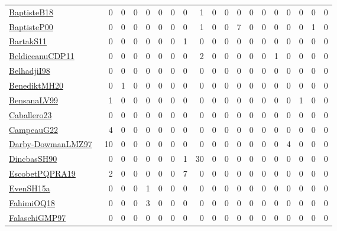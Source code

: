 {\begin{longtable}{l*{18}{r}}
\href{articles/BaptisteB18.pdf}{BaptisteB18}~\cite{BaptisteB18} & 0 & 0 & 0 & 0 & 0 & 0 & 0 & 1 & 0 & 0 & 0 & 0 & 0 & 0 & 0 & 0 & 0 & 0\\
\href{articles/BaptisteP00.pdf}{BaptisteP00}~\cite{BaptisteP00} & 0 & 0 & 0 & 0 & 0 & 0 & 0 & 1 & 0 & 0 & 7 & 0 & 0 & 0 & 0 & 0 & 1 & 0\\
\href{articles/BartakS11.pdf}{BartakS11}~\cite{BartakS11} & 0 & 0 & 0 & 0 & 0 & 0 & 1 & 0 & 0 & 0 & 0 & 0 & 0 & 0 & 0 & 0 & 0 & 0\\
\href{articles/BeldiceanuCDP11.pdf}{BeldiceanuCDP11}~\cite{BeldiceanuCDP11} & 0 & 0 & 0 & 0 & 0 & 0 & 0 & 2 & 0 & 0 & 0 & 0 & 0 & 1 & 0 & 0 & 0 & 0\\
\href{articles/BelhadjiI98.pdf}{BelhadjiI98}~\cite{BelhadjiI98} & 0 & 0 & 0 & 0 & 0 & 0 & 0 & 0 & 0 & 0 & 0 & 0 & 0 & 0 & 0 & 0 & 0 & 0\\
\href{articles/BenediktMH20.pdf}{BenediktMH20}~\cite{BenediktMH20} & 0 & 1 & 0 & 0 & 0 & 0 & 0 & 0 & 0 & 0 & 0 & 0 & 0 & 0 & 0 & 0 & 0 & 0\\
\href{articles/BensanaLV99.pdf}{BensanaLV99}~\cite{BensanaLV99} & 1 & 0 & 0 & 0 & 0 & 0 & 0 & 0 & 0 & 0 & 0 & 0 & 0 & 0 & 0 & 1 & 0 & 0\\
\href{articles/Caballero23.pdf}{Caballero23}~\cite{Caballero23} & 0 & 0 & 0 & 0 & 0 & 0 & 0 & 0 & 0 & 0 & 0 & 0 & 0 & 0 & 0 & 0 & 0 & 0\\
\href{articles/CampeauG22.pdf}{CampeauG22}~\cite{CampeauG22} & 4 & 0 & 0 & 0 & 0 & 0 & 0 & 0 & 0 & 0 & 0 & 0 & 0 & 0 & 0 & 0 & 0 & 0\\
\href{articles/Darby-DowmanLMZ97.pdf}{Darby-DowmanLMZ97}~\cite{Darby-DowmanLMZ97} & 10 & 0 & 0 & 0 & 0 & 0 & 0 & 0 & 0 & 0 & 0 & 0 & 0 & 0 & 4 & 0 & 0 & 0\\
\href{articles/DincbasSH90.pdf}{DincbasSH90}~\cite{DincbasSH90} & 0 & 0 & 0 & 0 & 0 & 0 & 1 & 30 & 0 & 0 & 0 & 0 & 0 & 0 & 0 & 0 & 0 & 0\\
\href{articles/EscobetPQPRA19.pdf}{EscobetPQPRA19}~\cite{EscobetPQPRA19} & 2 & 0 & 0 & 0 & 0 & 0 & 7 & 0 & 0 & 0 & 0 & 0 & 0 & 0 & 0 & 0 & 0 & 0\\
\href{articles/EvenSH15a.pdf}{EvenSH15a}~\cite{EvenSH15a} & 0 & 0 & 0 & 1 & 0 & 0 & 0 & 0 & 0 & 0 & 0 & 0 & 0 & 0 & 0 & 0 & 0 & 0\\
\href{articles/FahimiOQ18.pdf}{FahimiOQ18}~\cite{FahimiOQ18} & 0 & 0 & 0 & 3 & 0 & 0 & 0 & 0 & 0 & 0 & 0 & 0 & 0 & 0 & 0 & 0 & 0 & 0\\
\href{articles/FalaschiGMP97.pdf}{FalaschiGMP97}~\cite{FalaschiGMP97} & 0 & 0 & 0 & 0 & 0 & 0 & 0 & 0 & 0 & 0 & 0 & 0 & 0 & 0 & 0 & 0 & 0 & 0\\

\end{longtable}}
